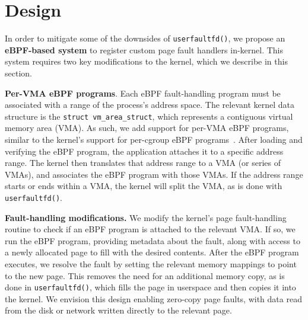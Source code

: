 \section{Design}
\label{sec:design}


In order to mitigate some of the downsides of \texttt{userfaultfd()}, we propose an \textbf{eBPF-based system} to register custom page fault handlers in-kernel.
This system requires two key modifications to the kernel, which we describe in this section.


\textbf{Per-VMA eBPF programs}. Each eBPF fault-handling program must be associated with a range of the process's address space. The relevant kernel data structure is the \texttt{struct vm\_area\_struct}, which represents a contiguous virtual memory area (VMA). As such, we add support for per-VMA eBPF programs, similar to the kernel's support for per-cgroup eBPF programs~\cite{per-cgroup-bpf}.
After loading and verifying the eBPF program, the application attaches it to a specific address range. The kernel then translates that address range to a VMA (or series of VMAs), and associates the eBPF program with those VMAs.
If the address range starts or ends within a VMA, the kernel will split the VMA, as is done with \texttt{userfaultfd()}.

\textbf{Fault-handling modifications.} We modify the kernel's page fault-handling routine to check if an eBPF program is attached to the relevant VMA. If so, we run the eBPF program, providing metadata about the fault, along with access to a newly allocated page to fill with the desired contents. After the eBPF program executes, we resolve the fault by setting the relevant memory mappings to point to the new page. This removes the need for an additional memory copy, as is done in \texttt{userfaultfd()}, which fills the page in userspace and then copies it into the kernel. We envision this design enabling zero-copy page faults, with data read from the disk or network written directly to the relevant page.

